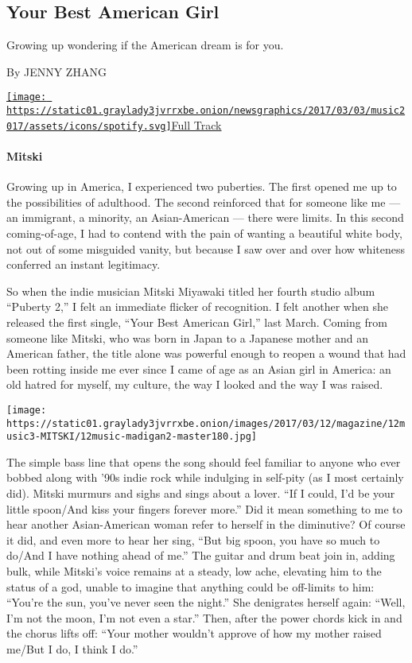 \hypertarget{--your-best-american-girl}{%
\subsection{\texorpdfstring{ Your Best American
Girl}{  Your Best American Girl}}\label{--your-best-american-girl}}

Growing up wondering if the American dream is for you.

By JENNY ZHANG

\href{https://open.spotify.com/track/172rW45GEnGoJUuWfm1drt}{\texttt{[image: https://static01.graylady3jvrrxbe.onion/newsgraphics/2017/03/03/music2017/assets/icons/spotify.svg]}Full
Track}

\hypertarget{mitski}{%
\paragraph{Mitski}\label{mitski}}

Growing up in America, I experienced two puberties. The first opened me
up to the possibilities of adulthood. The second reinforced that for
someone like me --- an immigrant, a minority, an Asian-American ---
there were limits. In this second coming-of-age, I had to contend with
the pain of wanting a beautiful white body, not out of some misguided
vanity, but because I saw over and over how whiteness conferred an
instant legitimacy.

So when the indie musician Mitski Miyawaki titled her fourth studio
album ``Puberty 2,'' I felt an immediate flicker of recognition. I felt
another when she released the first single, ``Your Best American Girl,''
last March. Coming from someone like Mitski, who was born in Japan to a
Japanese mother and an American father, the title alone was powerful
enough to reopen a wound that had been rotting inside me ever since I
came of age as an Asian girl in America: an old hatred for myself, my
culture, the way I looked and the way I was raised.

\texttt{[image: https://static01.graylady3jvrrxbe.onion/images/2017/03/12/magazine/12music3-MITSKI/12music-madigan2-master180.jpg]}

The simple bass line that opens the song should feel familiar to anyone
who ever bobbed along with '90s indie rock while indulging in self-pity
(as I most certainly did). Mitski murmurs and sighs and sings about a
lover. ``If I could, I'd be your little spoon/And kiss your fingers
forever more.'' Did it mean something to me to hear another
Asian-American woman refer to herself in the diminutive? Of course it
did, and even more to hear her sing, ``But big spoon, you have so much
to do/And I have nothing ahead of me.'' The guitar and drum beat join
in, adding bulk, while Mitski's voice remains at a steady, low ache,
elevating him to the status of a god, unable to imagine that anything
could be off-limits to him: ``You're the sun, you've never seen the
night.'' She denigrates herself again: ``Well, I'm not the moon, I'm not
even a star.'' Then, after the power chords kick in and the chorus lifts
off: ``Your mother wouldn't approve of how my mother raised me/But I do,
I think I do.''

